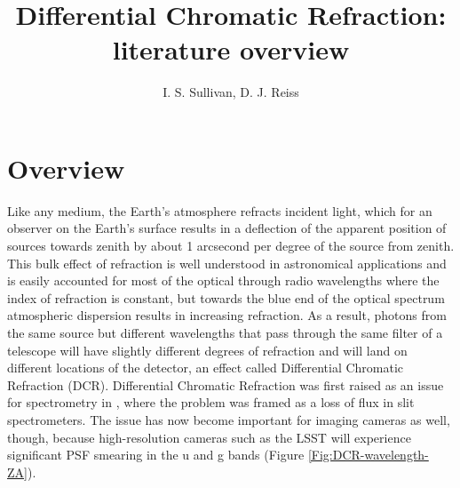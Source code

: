 \documentclass[]{article}
\title{Differential Chromatic Refraction: literature overview}
\author{I. S. Sullivan, D. J. Reiss}
\begin{document}
\maketitle


%

\section{Overview}
Like any medium, the Earth's atmosphere refracts incident light, which for an observer on the Earth's surface results in a deflection of the apparent position of sources towards zenith by about 1 arcsecond per degree of the source from zenith. This bulk effect of refraction is well understood in astronomical applications and is easily accounted for most of the optical through radio wavelengths where the index of refraction is constant, but towards the blue end of the optical spectrum atmospheric dispersion results in increasing refraction. As a result, photons from the same source but different wavelengths that pass through the same filter of a telescope will have slightly different degrees of refraction and will land on different locations of the detector, an effect called Differential Chromatic Refraction (DCR). Differential Chromatic Refraction was first raised as an issue for spectrometry in \cite{Filippenko1982}, where the problem was framed as a loss of flux in slit spectrometers. The issue has now become important for imaging cameras as well, though, because high-resolution cameras such as the LSST will experience significant PSF smearing in the u and g bands (Figure  \ref{Fig:DCR-wavelength-ZA}).
\end{document}
